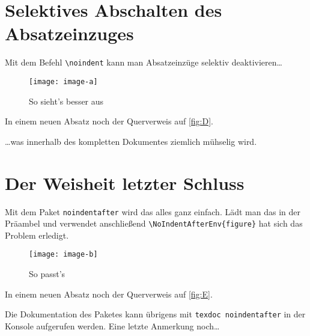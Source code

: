 \documentclass[english,ngerman]{tudscrartcl}
\newcommand*\ignorefloats{%
  \renewenvironment{figure}[1][]{}{}%
  \renewenvironment{table}[1][]{}{}%
  \renewcommand*\caption[1]{}%
  \renewcommand*\label[1]{}%
}
\begin{document}
\clearpage
\section{Selektives Abschalten des Absatzeinzuges}
Mit dem Befehl \verb|\noindent| kann man Absatzeinzüge selektiv 
deaktivieren\dots
%
\InputHook{\ignorefloats}
\begin{Excerpt}
\blindtext

\begin{figure}[h]
\centering
\texttt{[image: image-a]}
\caption{So sieht's besser aus}
\label{fig:D}
\end{figure}

\noindent\blindtext

In einem neuen Absatz noch der Querverweis auf \autoref{fig:D}.
\end{Excerpt}
%
\dots was innerhalb des kompletten Dokumentes ziemlich mühselig wird.

\clearpage
\section{Der Weisheit letzter Schluss}
Mit dem Paket \verb|noindentafter| wird das alles ganz einfach. Lädt man das in 
der Präambel und verwendet anschließend \verb|\NoIndentAfterEnv{figure}| hat 
sich das Problem erledigt.
%
\InputHook{\ignorefloats}
\begin{Excerpt}
\blindtext

\begin{figure}[h]
\centering
\texttt{[image: image-b]}
\caption{So passt's}
\label{fig:E}
\end{figure}

\blindtext

In einem neuen Absatz noch der Querverweis auf \autoref{fig:E}.
\end{Excerpt}
%
Die Dokumentation des Paketes kann übrigens mit \verb|texdoc noindentafter| in 
der Konsole aufgerufen werden. Eine letzte Anmerkung noch\dots

\clearpage
\end{document}
